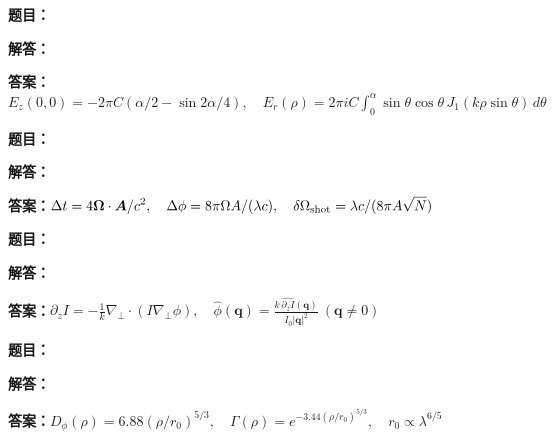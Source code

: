 \documentclass[lang=cn,color=blue,11pt]{elegantbook}
\begin{document}
\noindent\textbf{题目：}
\par\noindent\textbf{解答：}
\par\noindent\textbf{答案：}\(\displaystyle E_z(0,0)=-2\pi C\left(\alpha/2-\sin2\alpha/4\right),\quad E_r(\rho)=2\pi i C\int_0^\alpha\sin\theta\cos\theta\,J_1(k\rho\sin\theta)\,d\theta\)\par
\par\smallskip\noindent\hrulefill\par\medskip
{}\par
\noindent\textbf{题目：}
\par\noindent\textbf{解答：}
\par\noindent\textbf{答案：}\(\displaystyle \Delta t=4\boldsymbol\Omega\cdot\boldsymbol A/c^2,\quad \Delta\phi=8\pi\Omega A/(\lambda c),\quad\delta\Omega_{\rm shot}=\lambda c/(8\pi A\sqrt N)\)\par
\par\smallskip\noindent\hrulefill\par\medskip
{}\par
\noindent\textbf{题目：}
\par\noindent\textbf{解答：}
\par\noindent\textbf{答案：}\(\displaystyle \partial_z I=-\frac1k\nabla_\perp\cdot(I\nabla_\perp\phi),\quad \widehat\phi(\boldsymbol q)=\frac{k\,\widehat{\partial_z I}(\boldsymbol q)}{I_0|\boldsymbol q|^2}\ (\boldsymbol q\ne0)\)\par
\par\smallskip\noindent\hrulefill\par\medskip
{}\par
\noindent\textbf{题目：}
\par\noindent\textbf{解答：}
\par\noindent\textbf{答案：}\(\displaystyle D_\phi(\rho)=6.88(\rho/r_0)^{5/3},\quad \Gamma(\rho)=e^{-3.44(\rho/r_0)^{5/3}},\quad r_0\propto\lambda^{6/5}\)\par
\end{document}
